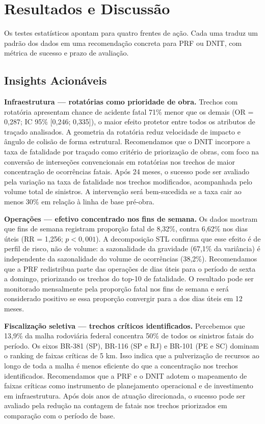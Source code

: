 \documentclass[12pt]{article}
\begin{document}
\section{Resultados e Discussão}

Os testes estatísticos apontam para quatro frentes de ação.
Cada uma traduz um padrão dos dados em uma recomendação concreta
para PRF ou DNIT, com métrica de sucesso e prazo de avaliação.

\subsection{Insights Acionáveis}

\textbf{Infraestrutura — rotatórias como prioridade de obra.}
Trechos com rotatória apresentam chance de acidente fatal 71\%
menor que os demais (OR = 0{,}287; IC 95\% [0{,}246; 0{,}335]),
o maior efeito protetor entre todos os atributos de traçado analisados.
A geometria da rotatória reduz velocidade de impacto e ângulo de
colisão de forma estrutural. Recomendamos que o DNIT incorpore a
taxa de fatalidade por traçado como critério de priorização de obras,
com foco na conversão de interseções convencionais em rotatórias nos
trechos de maior concentração de ocorrências fatais. Após 24 meses,
o sucesso pode ser avaliado pela variação na taxa de fatalidade nos
trechos modificados, acompanhada pelo volume total de sinistros.
A intervenção será bem-sucedida se a taxa cair ao menos 30\% em
relação à linha de base pré-obra.

\textbf{Operações — efetivo concentrado nos fins de semana.}
Os dados mostram que fins de semana registram proporção fatal de
8,32\%, contra 6,62\% nos dias úteis (RR = 1,256; $p < 0{,}001$).
A decomposição STL confirma que esse efeito é de perfil de risco,
não de volume: a sazonalidade da gravidade (67,1\% da variância)
é independente da sazonalidade do volume de ocorrências (38,2\%).
Recomendamos que a PRF redistribua parte das operações de dias
úteis para o período de sexta a domingo, priorizando os trechos
do top-10 de fatalidade. O resultado pode ser monitorado mensalmente
pela proporção fatal nos fins de semana e será considerado positivo
se essa proporção convergir para a dos dias úteis em 12 meses.

\textbf{Fiscalização seletiva — trechos críticos identificados.}
Percebemos que 13,9\% da malha rodoviária federal concentra 50\%
de todos os sinistros fatais do período. Os eixos BR-381 (SP),
BR-116 (SP e RJ) e BR-101 (PE e SC) dominam o ranking de
faixas críticas de 5 km. Isso indica que a pulverização de
recursos ao longo de toda a malha é menos eficiente do que
a concentração nos trechos identificados. Recomendamos que
a PRF e o DNIT adotem o mapeamento de faixas críticas como
instrumento de planejamento operacional e de investimento em
infraestrutura. Após dois anos de atuação direcionada, o
sucesso pode ser avaliado pela redução na contagem de fatais
nos trechos priorizados em comparação com o período de base.
\end{document}
